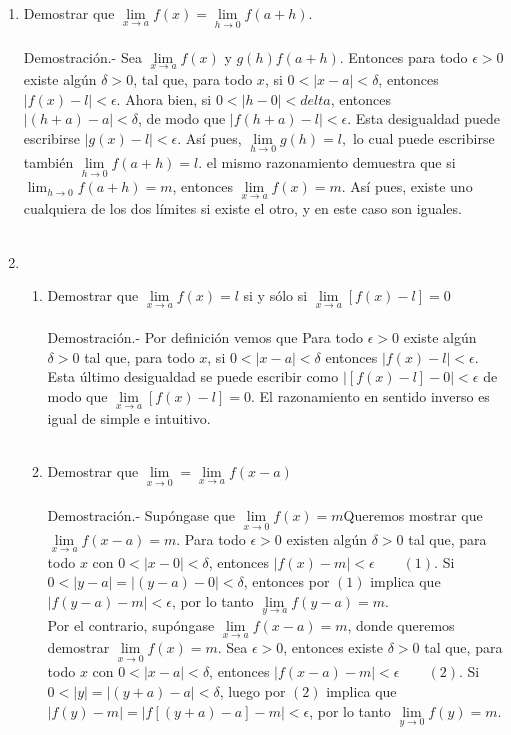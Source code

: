 \begin{enumerate}
\item Demostrar que $\lim\limits_{x\to a} f(x) = \lim\limits_{h \to 0}f(a+h).$\\\\
    Demostración.-\; Sea $\lim\limits_{x\to a} f(x)$ y $g(h) f(a+h)$. Entonces para todo $\epsilon>0$ existe algún $\delta > 0$, tal que, para todo $x$, si $0<|x-a|<\delta$, entonces $|f(x)-l|<\epsilon$. Ahora bien, si $0<|h-0|<delta$, entonces $|(h+a)-a|<\delta$, de modo que $|f(h+a)-l|<\epsilon$. Esta desigualdad puede escribirse $|g(x)-l|<\epsilon$. Así pues, $\lim\limits_{h\to 0}g(h) = l,$ lo cual puede escribirse también $\lim\limits_{h\to 0} f(a+h) = l$. el mismo razonamiento demuestra que si $\lim_{h\to 0} f(a+h) = m$, entonces $\lim\limits_{x\to a} f(x) = m.$ Así pues, existe uno cualquiera de los dos límites si existe el otro, y en este caso son iguales.\\\\ 

\item 
\begin{enumerate}[\bfseries (a)]

    \item Demostrar que $\lim\limits_{x\to a} f(x) = l$ si y sólo si $\lim\limits_{x \to a} [f(x)-l] = 0$\\\\
	Demostración.-\; Por definición vemos que Para todo $\epsilon>0$ existe algún $\delta > 0$ tal que, para todo $x$, si $0<|x-a|<\delta$ entonces $|f(x) - l| < \epsilon$. Esta último desigualdad se puede escribir como $|[f(x)-l]-0| < \epsilon$ de modo que $\lim\limits_{x\to a}[f(x)-l] = 0$. El razonamiento en sentido inverso es igual de simple e intuitivo.\\\\

    \item Demostrar que $\lim\limits_{x\to 0}  =  \lim\limits_{x\to a}f(x-a)$\\\\
	Demostración.-\; Supóngase que $\lim\limits_{x\to 0} f(x) = m$Queremos mostrar que $\lim\limits_{x\to a} f(x-a) = m$. Para todo $\epsilon>0$ existen algún $\delta > 0$ tal que, para todo $x$ con $0<|x-0|<\delta$, entonces $|f(x)-m|<\epsilon \qquad (1)$. Si $0<|y-a|=|(y-a)-0|<\delta$, entonces por $(1)$ implica que $|f(y-a)-m| < \epsilon$, por lo tanto $\lim\limits_{y\to a} f(y-a) = m$.\\
	Por el contrario, supóngase $\lim\limits_{x\to a} f(x-a) = m$, donde queremos demostrar $\lim\limits_{x\to 0} f(x) = m$. Sea $\epsilon>0$, entonces existe $\delta > 0$ tal que, para todo $x$ con $0<|x-a|<\delta$, entonces $|f(x-a)-m|<\epsilon \qquad (2)$. Si $0<|y|=|(y+a)-a|<\delta$, luego por $(2)$ implica que $|f(y)-m|=|f[(y+a)-a]-m|<\epsilon$, por lo tanto $\lim\limits_{y\to 0} f(y) = m$.\\\\


\end{enumerate}
\end{enumerate}
